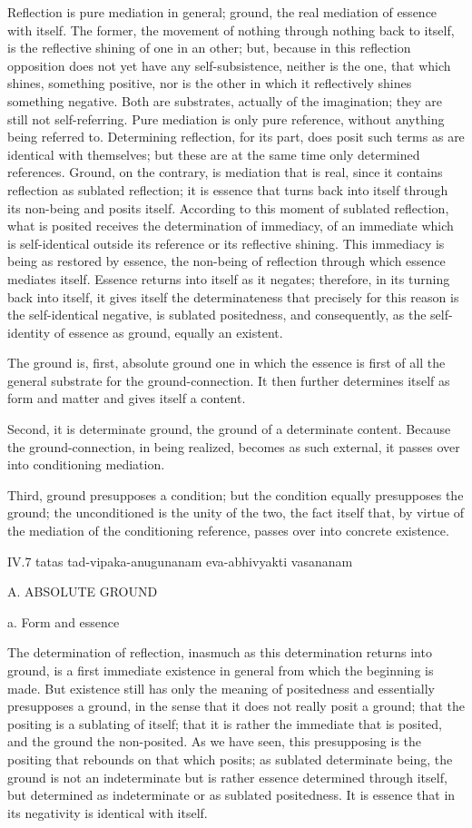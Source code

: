 Reflection is pure mediation in general;
ground, the real mediation of essence with itself.
The former, the movement of nothing through nothing back to itself,
is the reflective shining of one in an other;
but, because in this reflection opposition does not
yet have any self-subsistence,
neither is the one, that which shines, something positive,
nor is the other in which it reflectively shines something negative.
Both are substrates, actually of the imagination;
they are still not self-referring.
Pure mediation is only pure reference,
without anything being referred to.
Determining reflection, for its part, does posit
such terms as are identical with themselves;
but these are at the same time only determined references.
Ground, on the contrary, is mediation that is real,
since it contains reflection as sublated reflection;
it is essence that turns back into itself
through its non-being and posits itself.
According to this moment of sublated reflection,
what is posited receives the determination of immediacy,
of an immediate which is self-identical
outside its reference or its reflective shining.
This immediacy is being as restored by essence,
the non-being of reflection through which essence mediates itself.
Essence returns into itself as it negates;
therefore, in its turning back into itself,
it gives itself the determinateness that precisely
for this reason is the self-identical negative,
is sublated positedness, and consequently,
as the self-identity of essence as ground,
equally an existent.

The ground is, first, absolute ground
one in which the essence is first of all
the general substrate for the ground-connection.
It then further determines itself as form and matter
and gives itself a content.

Second, it is determinate ground,
the ground of a determinate content.
Because the ground-connection, in being realized,
becomes as such external,
it passes over into conditioning mediation.

Third, ground presupposes a condition;
but the condition equally presupposes the ground;
the unconditioned is the unity of the two,
the fact itself that, by virtue of
the mediation of the conditioning reference,
passes over into concrete existence.

IV.7
tatas tad-vipaka-anugunanam eva-abhivyakti vasananam

A. ABSOLUTE GROUND

a. Form and essence

The determination of reflection,
inasmuch as this determination returns into ground,
is a first immediate existence in general
from which the beginning is made.
But existence still has only the meaning of positedness
and essentially presupposes a ground,
in the sense that it does not really posit a ground;
that the positing is a sublating of itself;
that it is rather the immediate that is posited,
and the ground the non-posited.
As we have seen, this presupposing is the positing
that rebounds on that which posits;
as sublated determinate being, the ground is not an indeterminate
but is rather essence determined through itself,
but determined as indeterminate or as sublated positedness.
It is essence that in its negativity is identical with itself.

